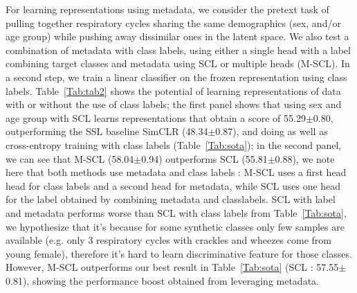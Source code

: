 \documentclass{article}
\begin{document}
\begin{sloppy}
For learning representations using metadata, we consider the pretext task of pulling together respiratory cycles sharing the same demographics (sex, and/or age group) while pushing away dissimilar ones in the latent space. We also test a combination of metadata with class labels, using either a single head with a label combining target classes and metadata using SCL or multiple heads (M-SCL). In a second step, we train a linear classifier on the frozen representation using class labels. Table~\ref{Tab:tab2} shows the potential of learning representations of data with or without the use of class labels; the first panel shows that using sex and age group with SCL learns representations that obtain a score of 55.29$\pm$0.80, outperforming the SSL baseline SimCLR (48.34$\pm$0.87), and doing as well as cross-entropy training with class labels (Table~\ref{Tab:sota}); in the second panel, we can see that M-SCL (58.04$\pm$0.94) outperforms SCL (55.81$\pm$0.88), we note here that both methods use metadata and class labels : M-SCL uses a first head head for class labels and a second head for metadata, while SCL uses one head for the label obtained by combining metadata and classlabels. SCL with label and metadata performs worse than SCL with class labels from Table~\ref{Tab:sota}, we hypothesize that it's because for some synthetic classes only few samples are available (e.g. only 3 respiratory cycles with crackles and wheezes come from young female), therefore it's hard to learn discriminative feature for those classes. However, M-SCL outperforms our best result in Table~\ref{Tab:sota} (SCL : 57.55$\pm$0.81), showing the performance boost obtained from leveraging metadata.

\begin{table}[]
\caption{Results on SPRSound}
\label{Tab:sprs}
\end{table}


\end{sloppy}
\end{document}
